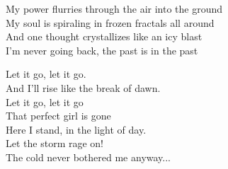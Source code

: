 \ve
{}My power flurries through the air into the ground\\
My soul is spiraling in frozen fractals all around\\
And one thought crystallizes like an icy blast\\
I'm never going back, the  past is in the past 

Let it go, let it go.\\
And I'll rise like the break of dawn.\\
Let it go, let it go\\
That perfect girl is gone\\
Here I stand, in the light of day.\\
Let the storm rage on!\\
The cold never bothered me anyway...

\esong{}